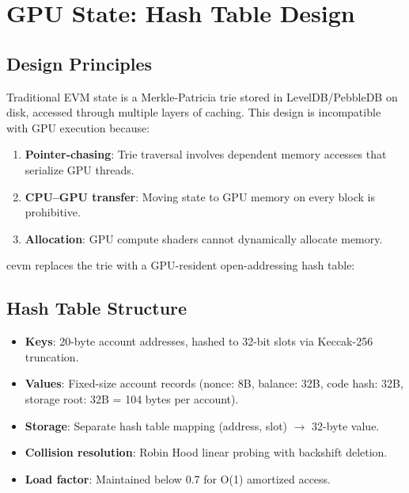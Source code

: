 \documentclass[11pt]{article}
\begin{document}
\section{GPU State: Hash Table Design}
\label{sec:state}

\subsection{Design Principles}

Traditional EVM state is a Merkle-Patricia trie stored in LevelDB/PebbleDB on disk,
accessed through multiple layers of caching. This design is incompatible with GPU
execution because:

\begin{enumerate}
\item \textbf{Pointer-chasing}: Trie traversal involves dependent memory accesses that
      serialize GPU threads.
\item \textbf{CPU--GPU transfer}: Moving state to GPU memory on every block is prohibitive.
\item \textbf{Allocation}: GPU compute shaders cannot dynamically allocate memory.
\end{enumerate}

cevm replaces the trie with a GPU-resident open-addressing hash table:

\subsection{Hash Table Structure}

\begin{itemize}
\item \textbf{Keys}: 20-byte account addresses, hashed to 32-bit slots via Keccak-256
      truncation.
\item \textbf{Values}: Fixed-size account records (nonce: 8B, balance: 32B, code hash: 32B,
      storage root: 32B = 104 bytes per account).
\item \textbf{Storage}: Separate hash table mapping (address, slot) $\to$ 32-byte value.
\item \textbf{Collision resolution}: Robin Hood linear probing with backshift deletion.
\item \textbf{Load factor}: Maintained below 0.7 for O(1) amortized access.
\end{itemize}
\end{document}
